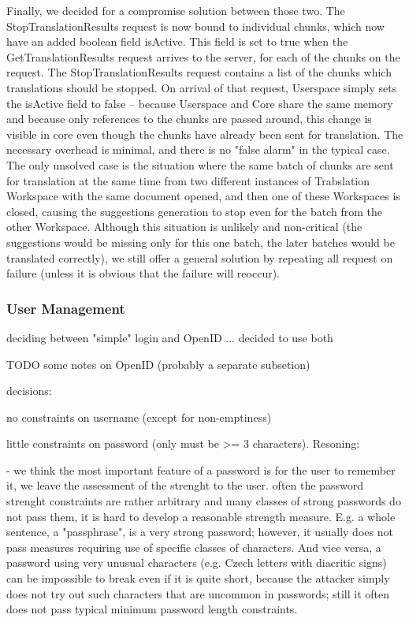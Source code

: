 Finally, we decided for a compromise solution between those two. The StopTranslationResults request is now bound to individual chunks, which now have an added boolean field isActive. This field is set to true when the GetTranslationResults request arrives to the server, for each of the chunks on the request. The StopTranslationResults request contains a list of the chunks which translations should be stopped. On arrival of that request, Userspace simply sets the isActive field to false -- because Userspace and Core share the same memory and because only references to the chunks are passed around, this change is visible in core even though the chunks have already been sent for translation. The necessary overhead is minimal, and there is no "false alarm" in the typical case. The only unsolved case is the situation where the same batch of chunks are sent for translation at the same time from two different instances of Trabslation Workspace with the same document opened, and then one of these Workspaces is closed, causing the suggestions generation to stop even for the batch from the other Workspace. Although this situation is unlikely and non-critical (the suggestions would be missing only for this one batch, the later batches would be translated correctly), we still offer a general solution by repeating all request on failure (unless it is obvious that the failure will reoccur).

\subsubsection{User Management}

deciding between "simple" login and OpenID ... decided to use both

TODO some notes on OpenID (probably a separate subsetion)

decisions:

no constraints on username (except for non-emptiness)

little constraints on password (only must be >= 3 characters). Resoning:

- we think the most important feature of a password is for the user to remember it, we leave the assessment of the strenght to the user.
often the password strenght constraints are rather arbitrary and many classes of strong passwords do not pass them, it is hard to develop a reasonable strength measure. E.g. a whole sentence, a "passphrase", is a very strong password; however, it usually does not pass measures requiring use of specific classes of characters. And vice versa, a password using very unusual characters (e.g. Czech letters with diacritic signs) can be impossible to break even if it is quite short, because the attacker simply does not try out such characters that are uncommon in passwords; still it often does not pass typical minimum password length constraints.

